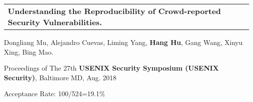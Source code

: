 \documentclass[a4paper,10pt]{article}
\newenvironment{packed_itemize}{
\begin{list}{\labelitemi}{\leftmargin=2em}
\setlength{\itemsep}{0pt}
\setlength{\parskip}{0pt}
\setlength{\parsep}{0pt}
\setlength{\headsep}{0pt}
\setlength{\topskip}{0pt}
\setlength{\topmargin}{0pt}
\setlength{\topsep}{0pt}
\setlength{\partopsep}{0pt}
}{\end{list}}
\begin{document}
\begin{tabular}{p{17.5cm}}
\textbf{Understanding the Reproducibility of Crowd-reported Security Vulnerabilities.}\\
\end{tabular}

\begin{packed_itemize}
\item Dongliang Mu, Alejandro Cuevas, Liming Yang, \textbf{Hang Hu}, Gang Wang, Xinyu Xing, Bing Mao.\\ 
\item Proceedings of The 27th \textbf{USENIX Security Symposium (USENIX Security)}, Baltimore MD, Aug. 2018\\
\item Acceptance Rate: 100/524=19.1\% \\
\end{packed_itemize}







\end{document}
